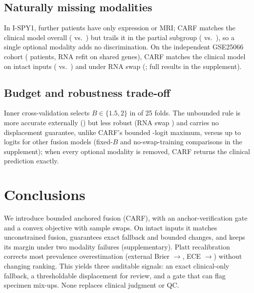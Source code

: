 \documentclass[a4paper,runningheads]{llncs}
\begin{document}
\subsection{Naturally missing modalities}
\label{sec:natural}

In I-SPY1, \NatPartialN{} further patients have only expression or MRI; CARF matches the clinical model overall (\NatAllCarfTwo{} vs.\ \NatAllClinical{}) but trails it in the partial subgroup (\NatPartialCarfTwo{} vs.\ \NatPartialClinical{}), so a single optional modality adds no discrimination. On the independent GSE25066 cohort (\GseN{} patients, RNA refit on shared genes), CARF matches the clinical model on intact inputs (\GseIntactCarfTwo{} vs.\ \GseIntactClinical{}) and under RNA swap (\GseRnaSwapCarfTwo{}; full results in the supplement).

\subsection{Budget and robustness trade-off}

Inner cross-validation selects $B\in\{1.5,2\}$ in \BudgetList{} of 25 folds. The unbounded rule is more accurate externally (\ExtCarfTwoUnbounded{}) but less robust (RNA swap \ExtRnaSwapCarfTwoUnbounded{}) and carries no displacement guarantee, unlike CARF's bounded \MaxDispCarfTwo{}-logit maximum, versus up to \MaxDispGatedOffsetLr{} logits for other fusion models (fixed-$B$ and no-swap-training comparisons in the supplement); when every optional modality is removed, CARF returns the clinical prediction exactly.

\section{Conclusions}

We introduce bounded anchored fusion (CARF), with an anchor-verification gate and a convex objective with sample swaps. On intact inputs it matches unconstrained fusion, guarantees exact fallback and bounded changes, and keeps its margin under two modality failures (supplementary). Platt recalibration corrects most prevalence overestimation (external Brier \CalibExtCarfBrierBefore{}$\to$\CalibExtCarfBrierAfter{}, ECE \CalibExtCarfEceBefore{}$\to$\CalibExtCarfEceAfter{}) without changing ranking. This yields three auditable signals: an exact clinical-only fallback, a thresholdable displacement for review, and a gate that can flag specimen mix-ups. None replaces clinical judgment or QC.
\end{document}
